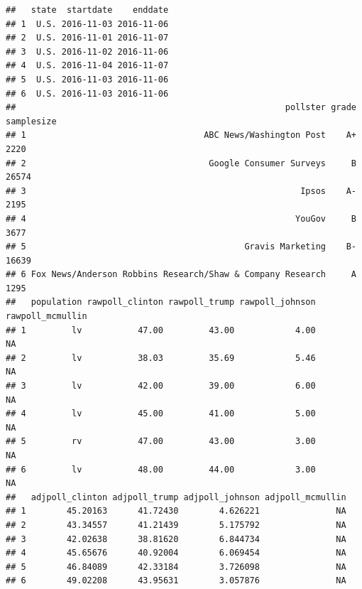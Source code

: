 \documentclass[
]{article}
\begin{document}
\begin{verbatim}
##   state  startdate    enddate
## 1  U.S. 2016-11-03 2016-11-06
## 2  U.S. 2016-11-01 2016-11-07
## 3  U.S. 2016-11-02 2016-11-06
## 4  U.S. 2016-11-04 2016-11-07
## 5  U.S. 2016-11-03 2016-11-06
## 6  U.S. 2016-11-03 2016-11-06
##                                                     pollster grade samplesize
## 1                                   ABC News/Washington Post    A+       2220
## 2                                    Google Consumer Surveys     B      26574
## 3                                                      Ipsos    A-       2195
## 4                                                     YouGov     B       3677
## 5                                           Gravis Marketing    B-      16639
## 6 Fox News/Anderson Robbins Research/Shaw & Company Research     A       1295
##   population rawpoll_clinton rawpoll_trump rawpoll_johnson rawpoll_mcmullin
## 1         lv           47.00         43.00            4.00               NA
## 2         lv           38.03         35.69            5.46               NA
## 3         lv           42.00         39.00            6.00               NA
## 4         lv           45.00         41.00            5.00               NA
## 5         rv           47.00         43.00            3.00               NA
## 6         lv           48.00         44.00            3.00               NA
##   adjpoll_clinton adjpoll_trump adjpoll_johnson adjpoll_mcmullin
## 1        45.20163      41.72430        4.626221               NA
## 2        43.34557      41.21439        5.175792               NA
## 3        42.02638      38.81620        6.844734               NA
## 4        45.65676      40.92004        6.069454               NA
## 5        46.84089      42.33184        3.726098               NA
## 6        49.02208      43.95631        3.057876               NA
\end{verbatim}
\end{document}
